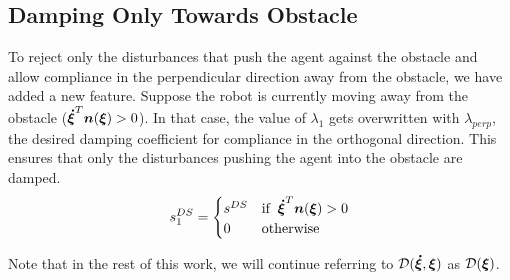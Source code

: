 \documentclass[conference]{IEEEtran}
\begin{document}

\subsection{Damping Only Towards Obstacle} \label{sec:damping_only_toward}
To reject only the disturbances that push the agent against the obstacle and allow compliance in the perpendicular direction away from the obstacle, we have added a new feature. Suppose the robot is currently moving away from the obstacle ($\boldsymbol{\dot\xi}^T \boldsymbol{n}(\boldsymbol{\xi}) > 0$). In that case, the value of $\lambda_1$ gets overwritten with $\lambda_{perp}$, the desired damping coefficient for compliance in the orthogonal direction. This ensures that only the disturbances pushing the agent into the obstacle are damped. \\


\begin{equation}
  s_1^{DS} =
  \begin{cases}
    s^{DS} & \text{if} \;\; \boldsymbol{\dot \xi}^T \boldsymbol{n}(\boldsymbol{\xi}) > 0 \\
    0 & \text{otherwise}
  \end{cases}
\end{equation}

Note that in the rest of this work, we will continue referring to $\mathcal{D}(\boldsymbol{\dot\xi}, \boldsymbol{\xi})$ as $\mathcal{D}(\boldsymbol{\xi})$.
\end{document}
